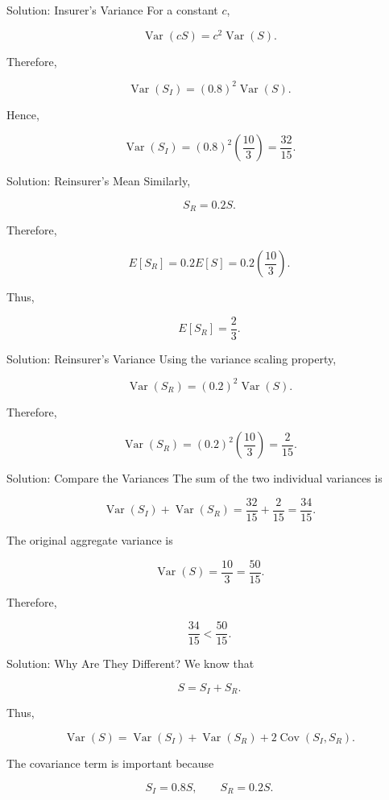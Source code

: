 \documentclass[
  ignorenonframetext,
  aspectratio=169,
]{beamer}
\begin{document}
\begin{frame}{Solution: Insurer's Variance}
\protect{}\label{solution-insurers-variance}
For a constant \(c\),

\[
\operatorname{Var}(cS)=c^2\operatorname{Var}(S).
\]

Therefore,

\[
\operatorname{Var}(S_I)
=
(0.8)^2\operatorname{Var}(S).
\]

Hence,

\[
\operatorname{Var}(S_I)
=
(0.8)^2\left(\frac{10}{3}\right)
=
\boxed{\frac{32}{15}}.
\]
\end{frame}

\begin{frame}{Solution: Reinsurer's Mean}
\protect{}\label{solution-reinsurers-mean}
Similarly,

\[
S_R=0.2S.
\]

Therefore,

\[
E[S_R]
=
0.2E[S]
=
0.2\left(\frac{10}{3}\right).
\]

Thus,

\[
\boxed{E[S_R]=\frac{2}{3}}.
\]
\end{frame}

\begin{frame}{Solution: Reinsurer's Variance}
\protect{}\label{solution-reinsurers-variance}
Using the variance scaling property,

\[
\operatorname{Var}(S_R)
=
(0.2)^2\operatorname{Var}(S).
\]

Therefore,

\[
\operatorname{Var}(S_R)
=
(0.2)^2\left(\frac{10}{3}\right)
=
\boxed{\frac{2}{15}}.
\]
\end{frame}

\begin{frame}{Solution: Compare the Variances}
\protect{}\label{solution-compare-the-variances}
The sum of the two individual variances is

\[
\operatorname{Var}(S_I)+\operatorname{Var}(S_R)
=
\frac{32}{15}+\frac{2}{15}
=
\boxed{\frac{34}{15}}.
\]

The original aggregate variance is

\[
\operatorname{Var}(S)=\frac{10}{3}
=\frac{50}{15}.
\]

Therefore,

\[
\boxed{
\frac{34}{15}<\frac{50}{15}
}.
\]
\end{frame}

\begin{frame}{Solution: Why Are They Different?}
\protect{}\label{solution-why-are-they-different}
We know that

\[
S=S_I+S_R.
\]

Thus,

\[
\operatorname{Var}(S)
=
\operatorname{Var}(S_I)
+
\operatorname{Var}(S_R)
+
2\operatorname{Cov}(S_I,S_R).
\]

The covariance term is important because

\[
S_I=0.8S,
\qquad
S_R=0.2S.
\]
\end{frame}
\end{document}
